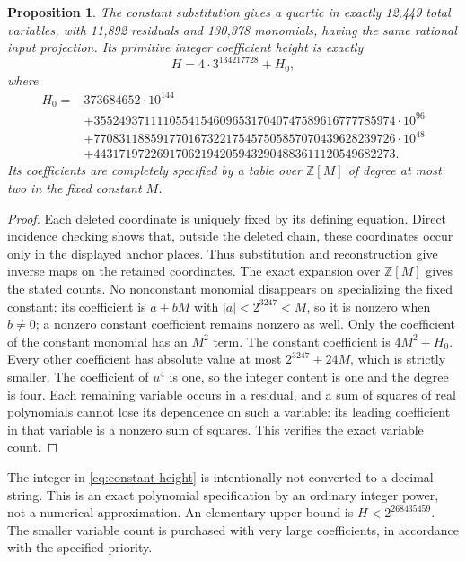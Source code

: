 \documentclass[11pt]{article}
\newtheorem{proposition}[theorem]{Proposition}
\theoremstyle{definition}
\newcommand{\Z}{\mathbb Z}
\begin{document}
\begin{proposition}\label{prop:constant-quartic}
The constant substitution gives a quartic in exactly 12,449 total
variables, with 11,892 residuals and 130,378 monomials, having the
same rational input projection. Its primitive integer coefficient
height is exactly
\begin{equation}\label{eq:constant-height}
 H=4\cdot3^{134217728}+H_0,
\end{equation}
where
\begin{align*}
H_0={}&373684652\cdot10^{144}\\
&+ 355249371111055415460965317040747589616777785974\cdot10^{96}\\
&+ 770831188591770167322175457505857070439628239726\cdot10^{48}\\
&+ 443171972269170621942059432904883611120549682273.
\end{align*}
Its coefficients are completely specified by a table over $\Z[M]$
of degree at most two in the fixed constant $M$.
\end{proposition}
\begin{proof}
Each deleted coordinate is uniquely fixed by its defining equation.
Direct incidence checking shows that, outside the deleted chain, these
coordinates occur only in the displayed anchor places. Thus substitution
and reconstruction give inverse maps on the retained coordinates.
The exact expansion over $\Z[M]$ gives the stated counts.
No nonconstant monomial disappears on specializing the fixed constant:
its coefficient is $a+bM$ with $|a|<2^{3247}<M$, so it is nonzero
when $b\ne0$; a nonzero constant coefficient remains nonzero as well.
Only the coefficient of the constant monomial has an $M^2$ term.
The constant coefficient is $4M^2+H_0$. Every other coefficient has
absolute value at most $2^{3247}+24M$, which is strictly smaller.
The coefficient of $u^4$ is one, so the integer content is one and the
degree is four. Each remaining variable occurs in a residual, and a
sum of squares of real polynomials cannot lose its dependence on such
a variable: its leading coefficient in that variable is a nonzero
sum of squares. This verifies the exact variable count.
\end{proof}

The integer in \eqref{eq:constant-height} is intentionally not converted
to a decimal string. This is an exact polynomial specification by an
ordinary integer power, not a numerical approximation. An elementary
upper bound is $H<2^{268435459}$. The smaller variable count is purchased
with very large coefficients, in accordance with the specified priority.
\end{document}
